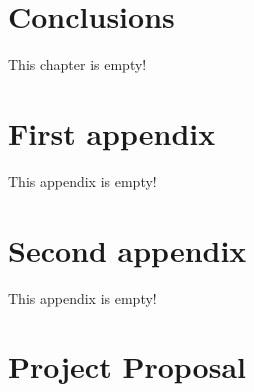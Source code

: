 \documentclass[12pt,a4paper,twoside,openright]{report}
\begin{document}
\chapter{Conclusions}

This chapter is empty!




\appendix

\chapter{First appendix}
 
 This appendix is empty!
 
\chapter{Second appendix}

This appendix is empty!

\chapter{Project Proposal}


\end{document}

